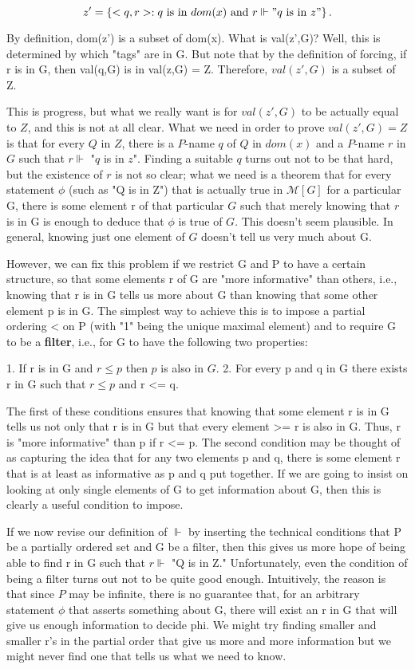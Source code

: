\documentclass[10pt]{article}
\theoremstyle{definition}
\begin{document}
  $$z' = \left\{<q,r> : q\text{ is in }dom(x)\text{ and }r \Vdash "q\text{ is in }z"\right\}.$$

By definition, dom(z') is a subset of dom(x).  What is val(z',G)?  Well,
this is determined by which "tags" are in G.  But note that by the
definition of forcing, if r is in G, then val(q,G) is in val(z,G) = Z.
Therefore, $val(z',G)$ is a subset of Z.

This is progress, but what we really want is for $val(z',G)$ to be actually
equal to $Z$, and this is not at all clear.  What we need in order to prove
$val(z',G) = Z$ is that for every $Q$ in $Z$, there is a $P$-name $q$ of $Q$ in $dom(x)$
and a $P$-name $r$ in $G$ such that $r \Vdash$ "$q$ is in $z$".  Finding a suitable $q$ turns
out not to be that hard, but the existence of $r$ is not so clear; what we
need is a theorem that for every statement $\phi$ (such as "Q is in Z") that is
actually true in $\mathcal{M}[G]$ for a particular G, there is some element r of that
particular $G$ such that merely knowing that $r$ is in G is enough to deduce
that $\phi$ is true of $G$.  This doesn't seem plausible.  In general, knowing
just one element of $G$ doesn't tell us very much about G.

However, we can fix this problem if we restrict G and P to have a certain
structure, so that some elements r of G are "more informative" than others,
i.e., knowing that r is in G tells us more about G than knowing that some
other element p is in G.  The simplest way to achieve this is to impose a
partial ordering < on P (with "1" being the unique maximal element) and to
require G to be a \textbf{filter}, i.e., for G to have the following two
properties:

1. If r is in G and $r \leq p$ then $p$ is also in $G$.
2. For every p and q in G there exists r in G such that $r \leq p$ and r <= q.

The first of these conditions ensures that knowing that some element r is in
G tells us not only that r is in G but that every element >= r is also in G.
Thus, r is "more informative" than p if r <= p.  The second condition may be
thought of as capturing the idea that for any two elements p and q, there is
some element r that is at least as informative as p and q put together.  If
we are going to insist on looking at only single elements of G to get
information about G, then this is clearly a useful condition to impose.

If we now revise our definition of $\Vdash$ by inserting the technical conditions
that P be a partially ordered set and G be a filter, then this gives us more
hope of being able to find r in G such that $r \Vdash$ "Q is in Z."
Unfortunately, even the condition of being a filter turns out not to be
quite good enough.  Intuitively, the reason is that since $P$ may be infinite,
there is no guarantee that, for an arbitrary statement $\phi$ that asserts
something about G, there will exist an r in G that will give us enough
information to decide phi.  We might try finding smaller and smaller r's in
the partial order that give us more and more information but we might never
find one that tells us what we need to know.
\end{document}
